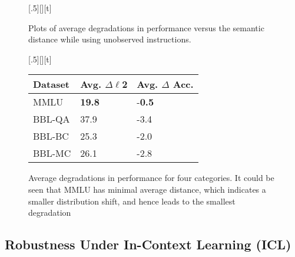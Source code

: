\begin{figure}[h]
  \begin{floatrow}
    [.5\textwidth][\FBheight][t]{
      \centering
    }
    {
      \caption{Plots of average degradations in performance versus the semantic distance while using unobserved instructions.}
      \label{fig:perf-dist-reg}
    }
    [.5\textwidth][\FBheight][t]{
      \vspace{-30pt}
      \begin{tabular}{l l l}
        \toprule
        \textbf{Dataset} & \textbf{Avg.} $\Delta\ell$2 & \textbf{Avg. $\Delta$ Acc.} \\
        \midrule
        \textsc{MMLU}    & \textbf{19.8}               & -\textbf{0.5}               \\
        \midrule
        \textsc{BBL-QA}  & 37.9                        & -3.4                        \\
        \textsc{BBL-BC}  & 25.3                        & -2.0                        \\
        \textsc{BBL-MC}  & 26.1                        & -2.8                        \\
        \bottomrule
      \end{tabular}
    }
    {
      \caption{Average degradations in performance for four categories. It could be seen that \textsc{MMLU} has minimal average distance, which indicates a smaller distribution shift, and hence leads to the smallest degradation}
      \label{table:distances}
    }
  \end{floatrow}
\end{figure}

\begin{comment}
\caption{Average degradations in performance observed when using instructions unobserved training as a function of the similarity between (a) the representation induced by the model for a given instruction, and, (b) the same for the \emph{nearest} observed instruction. This is for Flan-T5 (XXL). We use representations for the first token following the instruction, extracted from the penultimate layer in the network.}
\end{comment}

\vspace{-0.5em}
\subsection{Robustness Under In-Context Learning (ICL)}


